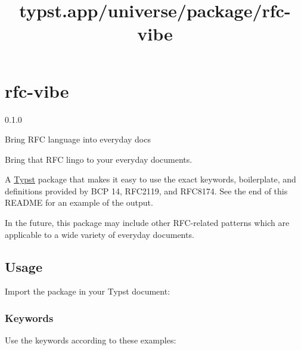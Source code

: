 \title{typst.app/universe/package/rfc-vibe}

\label{banner}
\section{rfc-vibe}\label{rfc-vibe}

{ 0.1.0 }

Bring RFC language into everyday docs

\label{readme}
Bring that RFC lingo to your everyday documents.

A \href{https://typst.app/}{Typst} package that makes it easy to use the
exact keywords, boilerplate, and definitions provided by BCP 14,
RFC2119, and RFC8174. See the end of this README for an example of the
output.

In the future, this package may include other RFC-related patterns which
are applicable to a wide variety of everyday documents.

\subsection{Usage}\label{usage}

Import the package in your Typst document:

\begin{Shaded}
\begin{Highlighting}[]
\end{Highlighting}
\end{Shaded}

\subsubsection{Keywords}\label{keywords}

Use the keywords according to these examples:

\begin{Shaded}
\begin{Highlighting}[]
\end{Highlighting}
\end{Shaded}

